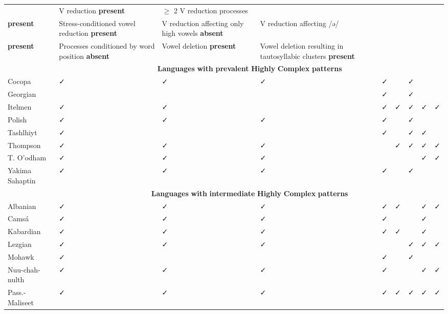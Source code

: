 \begin{table}
\begin{tabularx}{\textwidth}{XXXXXXXXX}
\lsptoprule
 & V reduction \textbf{present} & { ${\geq}$ 2 V reduction processes}\\

 \textbf{present} & Stress-conditioned vowel reduction \textbf{present} & V reduction affecting only high vowels \textbf{absent} & { V reduction affecting  /ə/}\\

 \textbf{present} & Processes conditioned by word position \textbf{absent} & Vowel deletion \textbf{present} & Vowel deletion resulting in tautosyllabic clusters \textbf{present}\\
& \multicolumn{8}{c}{ \textbf{Languages} \textbf{with} \textbf{prevalent} \textbf{Highly} \textbf{Complex} \textbf{patterns}}\\
\hhline{~--------}
 Cocopa & ✓ & ✓ & ✓ & ✓ &  & ✓ &  & \\
\hhline{~--------}
 Georgian &  &  &  & ✓ &  & ✓ &  & \\
\hhline{~--------}
 Itelmen & ✓ & ✓ &  & ✓ & ✓ & ✓ & ✓ & ✓\\
\hhline{~--------}
 Polish & ✓ & { ✓} & ✓ & ✓ &  & ✓ &  & \\
\hhline{~--------}
 Tashlhiyt & ✓ &  &  & ✓ &  & ✓ & ✓ & \\
\hhline{~--------}
 Thompson & ✓ & ✓ & ✓ &  & ✓ & ✓ & ✓ & ✓\\
\hhline{~--------}
 T. O’odham & ✓ & ✓ & ✓ &  &  &  & ✓ & ✓\\
\hhline{~--------}
 Yakima Sahaptin & ✓ & { ✓} & ✓ & ✓ &  & ✓ &  & \\
& \multicolumn{8}{c}{ \textbf{Languages} \textbf{with} \textbf{intermediate} \textbf{Highly} \textbf{Complex} \textbf{patterns}}\\
\hhline{~--------}
 Albanian & ✓ & ✓ & ✓ & ✓ & ✓ &  & ✓ & ✓\\
\hhline{~--------}
 Camsá & ✓ & ✓ & ✓ & ✓ &  &  & ✓ & \\
\hhline{~--------}
 Kabardian & ✓ & ✓ & ✓ & ✓ & ✓ &  & ✓ & \\
\hhline{~--------}
 Lezgian & ✓ & ✓ & ✓ &  &  & ✓ & ✓ & ✓\\
\hhline{~--------}
 Mohawk & ✓ &  &  & ✓ &  & ✓ &  & \\
\hhline{~--------}
 Nuu-chah-nulth & ✓ & ✓ & ✓ & ✓ &  &  & ✓ & ✓\\
\hhline{~--------}
 Pass.-Maliseet & ✓ & ✓ & ✓ & ✓ & ✓ & ✓ & ✓ & ✓\\

\end{tabularx}
\end{table}
